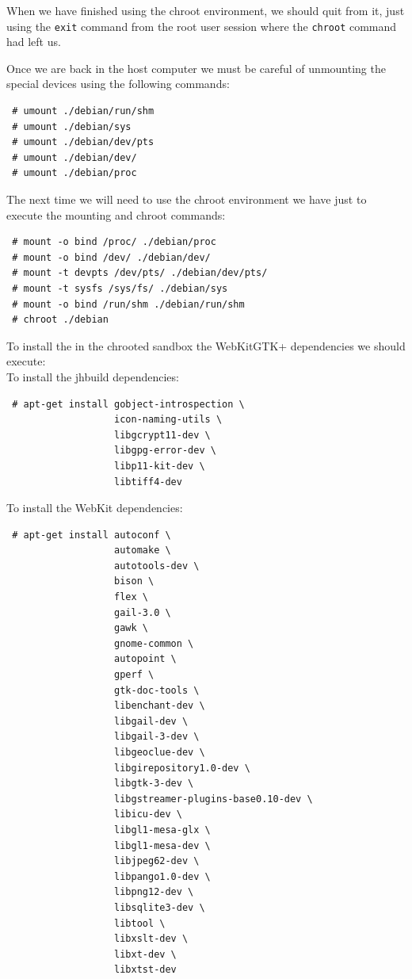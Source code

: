 \documentclass[a4paper,11pt,openany]{report}
\begin{document}
When we have finished using the chroot environment, we should quit from it, just using the \verb#exit# command from the root user session where the \verb#chroot# command had left us.

Once we are back in the host computer we must be careful of unmounting the special devices using the following commands:
\begin{verbatim}
 # umount ./debian/run/shm
 # umount ./debian/sys
 # umount ./debian/dev/pts
 # umount ./debian/dev/
 # umount ./debian/proc
\end{verbatim}

The next time we will need to use the chroot environment we have just to execute the mounting and chroot commands:
\begin{verbatim}
 # mount -o bind /proc/ ./debian/proc
 # mount -o bind /dev/ ./debian/dev/
 # mount -t devpts /dev/pts/ ./debian/dev/pts/
 # mount -t sysfs /sys/fs/ ./debian/sys
 # mount -o bind /run/shm ./debian/run/shm
 # chroot ./debian
\end{verbatim}

To install the in the chrooted sandbox the WebKitGTK+ dependencies we should execute:\\
To install the jhbuild dependencies:
\begin{verbatim}
 # apt-get install gobject-introspection \
                   icon-naming-utils \
                   libgcrypt11-dev \
                   libgpg-error-dev \
                   libp11-kit-dev \
                   libtiff4-dev
\end{verbatim}

To install the WebKit dependencies:
\begin{verbatim}
 # apt-get install autoconf \
                   automake \
                   autotools-dev \
                   bison \
                   flex \
                   gail-3.0 \
                   gawk \
                   gnome-common \
                   autopoint \
                   gperf \
                   gtk-doc-tools \
                   libenchant-dev \
                   libgail-dev \
                   libgail-3-dev \
                   libgeoclue-dev \
                   libgirepository1.0-dev \
                   libgtk-3-dev \
                   libgstreamer-plugins-base0.10-dev \
                   libicu-dev \
                   libgl1-mesa-glx \
                   libgl1-mesa-dev \
                   libjpeg62-dev \
                   libpango1.0-dev \
                   libpng12-dev \
                   libsqlite3-dev \
                   libtool \
                   libxslt-dev \
                   libxt-dev \
                   libxtst-dev
\end{verbatim}
\end{document}
